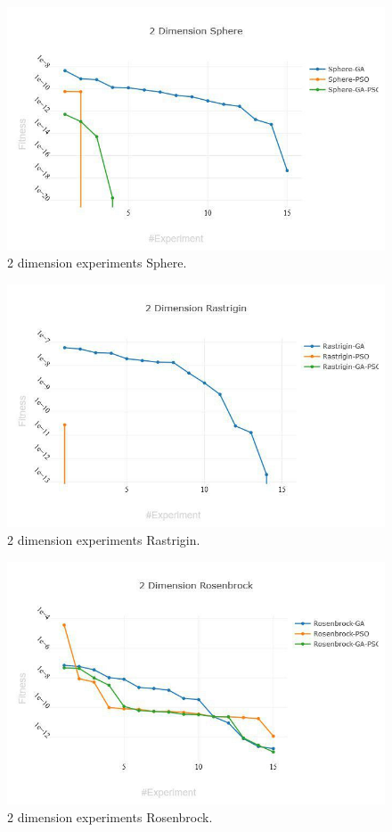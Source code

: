 \documentclass[runningheads]{llncs}
\begin{document}
\begin{figure}[htp]
\includegraphics[width=\textwidth]{img/2-sphere.jpg}
\caption{2 dimension experiments Sphere.} \label{fig1}
\end{figure}

\begin{figure}[htp]
  \includegraphics[width=\textwidth]{img/2-rastrigin.jpg}
  \caption{2 dimension experiments Rastrigin.} \label{fig1}
  \end{figure}
  
\begin{figure}[htp]
  \includegraphics[width=\textwidth]{img/2-rosenbrock.jpg}
  \caption{2 dimension experiments Rosenbrock.} \label{fig1}
  \end{figure}
\end{document}
